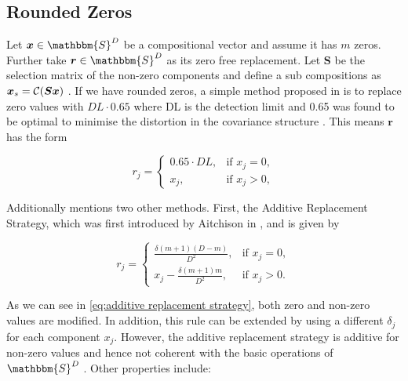 \subsection{Rounded Zeros}
\label{sec:Rounded Zeros}

Let $\bm{x} \in \mathbbm{S}^D$ be a compositional vector and assume it has $m$ zeros. Further take $\bm{r} \in \mathbbm{S}^D$ as its zero free replacement. Let $\bm{S}$ be the selection matrix of the non-zero components and define a sub compositions as $\bm{x}_s=\mathcal{C}(\bm{Sx})$ . If we have rounded zeros, a simple method proposed in \cite{Josep:2003} is to replace zero values with $DL \cdot 0.65$ where DL is the detection limit and 0.65 was found to be optimal to minimise the distortion in the covariance structure \cite{Lubbe:2021}. This means $\bm{r}$ has the form

\begin{equation}
r_j = 
\begin{cases}
0.65\cdot DL, & \text{if } x_j=0, \\
x_j, & \text{if } x_j>0, 
\end{cases}
\label{eq:DL065}
\end{equation}

Additionally \cite{Josep:2003} mentions two other methods. First, the Additive Replacement Strategy, which was first introduced by Aitchison in \cite{Aitchison:1986}, and is given by

\begin{equation}
r_j = 
\begin{cases}
\frac{\delta(m+1)(D-m)}{D^2}, & \text{if } x_j=0, \\
x_j - \frac{\delta(m+1)m}{D^2}, & \text{if } x_j>0.
\end{cases}
\label{eq:additive replacement strategy}
\end{equation}

As we can see in \ref{eq:additive replacement strategy}, both zero and non-zero values are modified. In addition, this rule can be extended by using a different $\delta_j$ for each component $x_j$. However, the additive replacement strategy is additive for non-zero values and hence not coherent with the basic operations of $\mathbbm{S}^D$ \cite{Josep:2003}. Other properties include:

